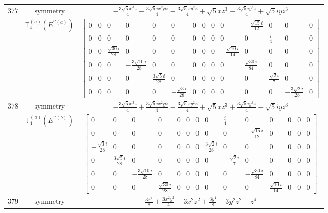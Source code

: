 \documentclass[fleqn,8pt,landscape]{jsarticle}
\begin{document}
\begin{longtable}{ccc}
$ 377 $ & $ \text{symmetry} $ & $ - \frac{3 \sqrt{5} x^{3} z}{4} - \frac{3 \sqrt{5} i x^{2} y z}{4} - \frac{3 \sqrt{5} x y^{2} z}{4} + \sqrt{5} x z^{3} - \frac{3 \sqrt{5} i y^{3} z}{4} + \sqrt{5} i y z^{3} $ \\
$  $ & $ \mathbb{T}_{4}^{(a)}(E^{\prime\prime(a)}) $ & $ \begin{bmatrix} 0 & 0 & 0 & 0 & 0 & 0 & 0 & 0 & 0 & 0 & - \frac{\sqrt{15} i}{12} & 0 & 0 & 0 \\ 0 & 0 & 0 & 0 & 0 & 0 & 0 & 0 & 0 & 0 & 0 & \frac{i}{4} & 0 & 0 \\ 0 & 0 & \frac{\sqrt{30} i}{28} & 0 & 0 & 0 & 0 & 0 & 0 & - \frac{\sqrt{10} i}{14} & 0 & 0 & 0 & 0 \\ 0 & 0 & 0 & - \frac{3 \sqrt{10} i}{28} & 0 & 0 & 0 & 0 & 0 & 0 & \frac{\sqrt{30} i}{84} & 0 & 0 & 0 \\ 0 & 0 & 0 & 0 & \frac{3 \sqrt{5} i}{28} & 0 & 0 & 0 & 0 & 0 & 0 & \frac{\sqrt{2} i}{7} & 0 & 0 \\ 0 & 0 & 0 & 0 & 0 & - \frac{\sqrt{3} i}{28} & 0 & 0 & 0 & 0 & 0 & 0 & - \frac{3 \sqrt{2} i}{28} & 0 \end{bmatrix} $ \\ \hline
$ 378 $ & $ \text{symmetry} $ & $ - \frac{3 \sqrt{5} x^{3} z}{4} + \frac{3 \sqrt{5} i x^{2} y z}{4} - \frac{3 \sqrt{5} x y^{2} z}{4} + \sqrt{5} x z^{3} + \frac{3 \sqrt{5} i y^{3} z}{4} - \sqrt{5} i y z^{3} $ \\
$  $ & $ \mathbb{T}_{4}^{(a)}(E^{\prime\prime(b)}) $ & $ \begin{bmatrix} 0 & 0 & 0 & 0 & 0 & 0 & 0 & 0 & \frac{i}{4} & 0 & 0 & 0 & 0 & 0 \\ 0 & 0 & 0 & 0 & 0 & 0 & 0 & 0 & 0 & - \frac{\sqrt{15} i}{12} & 0 & 0 & 0 & 0 \\ - \frac{\sqrt{3} i}{28} & 0 & 0 & 0 & 0 & 0 & 0 & \frac{3 \sqrt{2} i}{28} & 0 & 0 & 0 & 0 & 0 & 0 \\ 0 & \frac{3 \sqrt{5} i}{28} & 0 & 0 & 0 & 0 & 0 & 0 & - \frac{\sqrt{2} i}{7} & 0 & 0 & 0 & 0 & 0 \\ 0 & 0 & - \frac{3 \sqrt{10} i}{28} & 0 & 0 & 0 & 0 & 0 & 0 & - \frac{\sqrt{30} i}{84} & 0 & 0 & 0 & 0 \\ 0 & 0 & 0 & \frac{\sqrt{30} i}{28} & 0 & 0 & 0 & 0 & 0 & 0 & \frac{\sqrt{10} i}{14} & 0 & 0 & 0 \end{bmatrix} $ \\ \hline
$ 379 $ & $ \text{symmetry} $ & $ \frac{3 x^{4}}{8} + \frac{3 x^{2} y^{2}}{4} - 3 x^{2} z^{2} + \frac{3 y^{4}}{8} - 3 y^{2} z^{2} + z^{4} $ \\

\end{longtable}
\end{document}
